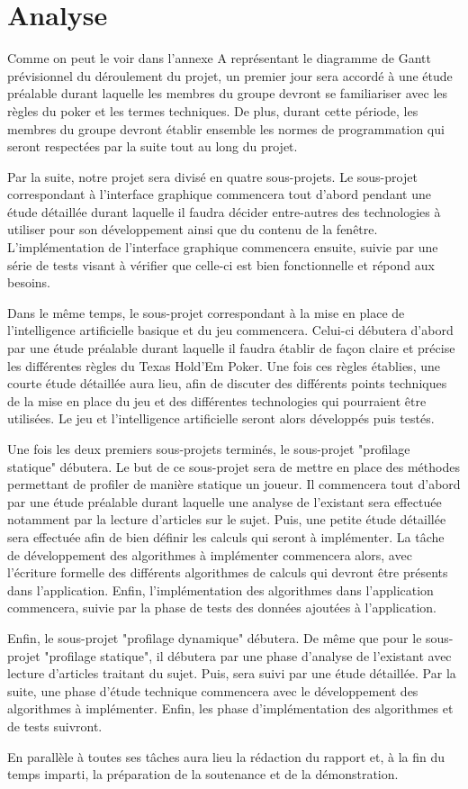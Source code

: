 \documentclass{report}
\begin{document}
\section{Analyse}
\hspace{0.5cm}Comme on peut le voir dans l'annexe A représentant le diagramme de Gantt prévisionnel du déroulement du projet, un premier jour sera accordé à une étude préalable durant laquelle les membres du groupe devront se familiariser avec les règles du poker et les termes techniques. De plus, durant cette période, les membres du groupe devront établir ensemble les normes de programmation qui seront respectées par la suite tout au long du projet.\par
Par la suite, notre projet sera divisé en quatre sous-projets. 
Le sous-projet correspondant à l'interface graphique commencera tout d'abord pendant une étude détaillée durant laquelle il faudra décider entre-autres des technologies à utiliser pour son développement ainsi que du contenu de la fenêtre. L'implémentation de l'interface graphique commencera ensuite, suivie par une série de tests visant à vérifier que celle-ci est bien fonctionnelle et répond aux besoins. \par
Dans le même temps, le sous-projet correspondant à la mise en place de l'intelligence artificielle basique et du jeu commencera. Celui-ci débutera d'abord par une étude préalable durant laquelle il faudra établir de façon claire et précise les différentes règles du Texas Hold'Em Poker. Une fois ces règles établies, une courte étude détaillée aura lieu, afin de discuter des différents points techniques de la mise en place du jeu et des différentes technologies qui pourraient être utilisées. Le jeu et l'intelligence artificielle seront alors développés puis testés.\par
Une fois les deux premiers sous-projets terminés, le sous-projet "profilage statique" débutera. Le but de ce sous-projet sera de mettre en place des méthodes permettant de profiler de manière statique un joueur. Il commencera tout d'abord par une étude préalable durant laquelle une analyse de l'existant sera effectuée notamment par la lecture d'articles sur le sujet. Puis, une petite étude détaillée sera effectuée afin de bien définir les calculs qui seront à implémenter. La tâche de développement des algorithmes à implémenter commencera alors, avec l'écriture formelle des différents algorithmes de calculs qui devront être présents dans l'application. Enfin, l'implémentation des algorithmes dans l'application commencera, suivie par la phase de tests des données ajoutées à l'application. \par
Enfin, le sous-projet "profilage dynamique" débutera. De même que pour le sous-projet "profilage statique", il débutera par une phase d'analyse de l'existant avec lecture d'articles traitant du sujet. Puis, sera suivi par une étude détaillée. Par la suite, une phase d'étude technique commencera avec le développement des algorithmes à implémenter. Enfin, les phase d'implémentation des algorithmes et de tests suivront.\par
En parallèle à toutes ses tâches aura lieu la rédaction du rapport et, à la fin du temps imparti, la préparation de la soutenance et de la démonstration. \par
\newpage
\end{document}
